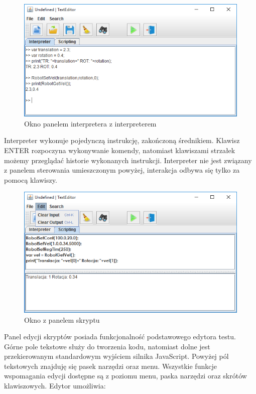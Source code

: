 \documentclass[eng,printmode]{mgr}
\begin{document}
   \begin{figure}[ht]
    \centering
    \includegraphics[width=1\textwidth]{images/iterpreter1}
    \caption{Okno panelem interpretera  z interpreterem }
    \label{fig:iterpreter1}
   \end{figure}

Interpreter wykonuje pojedynczą instrukcję, zakończoną średnikiem. Klawisz ENTER rozpoczyna wykonywanie komendy, natomiast klawiszami strzałek możemy przeglądać historie wykonanych instrukcji. Interpreter nie jest związany z panelem sterowania umieszczonym powyżej, interakcja odbywa się tylko za pomocą klawiszy. 

   \begin{figure}[ht]
    \centering
    \includegraphics[width=1\textwidth]{images/skryptowanie}
    \caption{Okno z panelem skryptu }
    \label{fig:skryptowanie}
   \end{figure}

Panel edycji skryptów posiada funkcjonalność podstawowego edytora testu. Górne pole tekstowe służy do tworzenia kodu, natomiast dolne jest przekierowanym standardowym wyjściem silnika JavaScript. Powyżej pól tekstowych znajduję się pasek narzędzi oraz menu. Wszystkie funkcje wspomagania edycji dostępne są z poziomu menu, paska narzędzi oraz skrótów klawiszowych. Edytor umożliwia:
\end{document}
